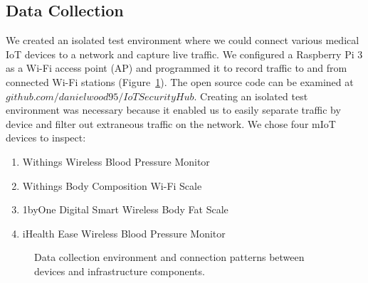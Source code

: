 \subsection{Data Collection}

We created an isolated test environment where we could connect various medical IoT devices to a network and capture live traffic. We configured a Raspberry Pi 3 as a Wi-Fi access point (AP) and programmed it to record traffic to and from connected Wi-Fi stations (Figure~\ref{fig:data-collection}). The open source code can be examined at $github.com/danielwood95/IoTSecurityHub$.  Creating an isolated test environment was necessary because it enabled us to easily separate traffic by device and filter out extraneous traffic on the network.   We chose four mIoT devices to inspect:

\begin{enumerate}
  \item Withings Wireless Blood Pressure Monitor
  \item Withings Body Composition Wi-Fi Scale
  \item 1byOne Digital Smart Wireless Body Fat Scale
  \item iHealth Ease Wireless Blood Pressure Monitor
\end{enumerate}

\begin{figure}
  \centering
  \caption{Data collection environment and connection patterns between devices and infrastructure components.}
  \label{fig:data-collection}
\end{figure}

